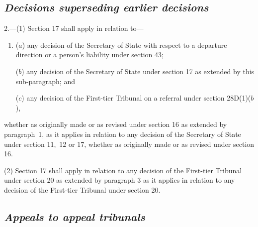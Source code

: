 \documentclass[12pt,a4paper]{article}
\begin{document}
\subsection*{\itshape Decisions superseding earlier decisions}

2.---(1) Section 17 shall apply in relation to—
\begin{enumerate}\item[]
($a$) any decision of the Secretary of State with respect to a departure direction
or a person’s liability under section 43;

($b$) any decision of the Secretary of State under section 17 as extended by this sub-paragraph; and

($c$) any decision of 
the First-tier Tribunal  %
on a referral under section 28D(1)($b$),
\end{enumerate}
whether as originally made or as revised under section 16 as extended by paragraph~1, as it applies in relation to any decision of the Secretary of State under section 11,~12 or 17, whether as originally made or as revised under section 16.

(2) Section 17 shall apply in relation to any decision of 
the First-tier Tribunal  %
under section 20 as extended by paragraph 3 as it applies in relation to any decision of 
the First-tier Tribunal  %
under section 20.


\subsection*{\itshape Appeals to appeal tribunals}
\end{document}
